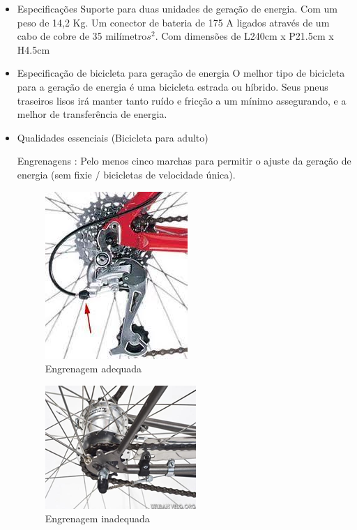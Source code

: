 \begin{itemize}
	\begin{itemize}
	\item Especificações
		Suporte para duas unidades de geração de energia. Com um peso de 14,2 Kg. Um conector de bateria de 175 A ligados através de um cabo de cobre de 35 milímetro$s^{2}$. Com dimensões de L240cm x P21.5cm x H4.5cm
	\end{itemize}	

	\begin{itemize}
	\item Especificação de bicicleta para geração de energia
		O melhor tipo de bicicleta para a geração de energia é uma bicicleta estrada ou híbrido. Seus pneus traseiros lisos irá manter tanto ruído e fricção a um mínimo assegurando, e a melhor de transferência de energia.
	\end{itemize}
	
	\begin{itemize}
		\item Qualidades essenciais (Bicicleta para adulto)
		
		Engrenagens : Pelo menos cinco marchas para permitir o ajuste da geração de energia (sem fixie / bicicletas de velocidade única).
	
	\begin{figure}[H]
	 \centering
	\label{Engrenagem adequada}
	 \includegraphics[keepaspectratio=true,scale=0.8]{interacao/12.png}
	 \caption{Engrenagem adequada}
	\end{figure}
	
	\begin{figure}[H]
	 \centering
	\label{Engrenagem inadequada}
	 \includegraphics[keepaspectratio=true,scale=0.8]{interacao/13.png}
	 \caption{Engrenagem inadequada}
	\end{figure}		
	

\end{itemize}
\end{itemize}
